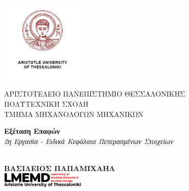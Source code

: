 \newcommand{\uni}{ΑΡΙΣΤΟΤΕΛΕΙΟ ΠΑΝΕΠΙΣΤΗΜΙΟ ΘΕΣΣΑΛΟΝΙΚΗΣ}
\newcommand{\faculty}{ΠΟΛΥΤΕΧΝΙΚΗ ΣΧΟΛΗ}
\newcommand{\tmhma}{ΤΜΗΜΑ ΜΗΧΑΝΟΛΟΓΩΝ ΜΗΧΑΝΙΚΩΝ}


\newcommand{\titlos}{Εξέταση Επαφών}
\newcommand{\ypotitlos}{2η Εργασία - Ειδικά Κεφάλαια Πεπερασμένων Στοιχείων}


\newcommand{\onomaauthor}{ΒΑΣΙΛΕΙΟΣ ΠΑΠΑΜΙΧΑΗΛ}


\newcommand{\advisor}{Γάκιας Χρήστος}
\newcommand{\mailauthor}{\href{mailto:vasilepi@meng.auth.gr}{vasilepi@meng.auth.gr}}
\newcommand{\aem}{6920}
\newcommand{\hmeromhnia}{\today}



\begin{titlepage}
    \begin{center}
    \includegraphics[width=4cm]{media/autheng.jpg}
     \end{center}
    
    \begin{center}
        \large
        \uni\\
        \normalsize
        \faculty\\
        \vspace{1em}
        \tmhma
    \end{center}

    \vspace{2cm}
    \begin{center}
        \Large
        \textbf{\titlos}\\
        \vspace{1em}
        \large
        \textit{\ypotitlos}
    \end{center}
    \begin{center}
        \\
    \vspace{7em}
    \Large
    \textcolor{BrickRed}{\textbf{\onomaauthor}}\\
    \vspace{3em}
    \includegraphics[width=0.3\textwidth]{media/newlogov3-cropped-content.png}
    \end{center}


\end{titlepage}
